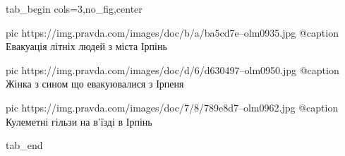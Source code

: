  
 
 
 
 


\ifcmt
  tab_begin cols=3,no_fig,center

     pic https://img.pravda.com/images/doc/b/a/ba5cd7e--olm0935.jpg
		 @caption Евакуація літніх людей з міста Ірпінь

		 pic https://img.pravda.com/images/doc/d/6/d630497--olm0950.jpg
		 @caption Жінка з сином що евакуювалися з Ірпеня

		 pic https://img.pravda.com/images/doc/7/8/789e8d7--olm0962.jpg
		 @caption Кулеметні гільзи на в'їзді в Ірпінь

  tab_end
\fi
